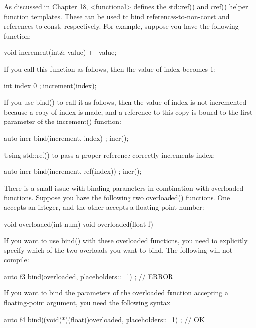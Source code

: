 As discussed in Chapter 18, <functional> defines the std::ref() and cref() helper function templates. These can be used to bind references-to-non-const and references-to-const, respectively. For example, suppose you have the following function:

\begin{cpp}
void increment(int& value) { ++value; }
\end{cpp}

If you call this function as follows, then the value of index becomes 1:

\begin{cpp}
int index { 0 };
increment(index);
\end{cpp}

If you use bind() to call it as follows, then the value of index is not incremented because a copy of index is made, and a reference to this copy is bound to the first parameter of the increment() function:

\begin{cpp}
auto incr { bind(increment, index) };
incr();
\end{cpp}

Using std::ref() to pass a proper reference correctly increments index:

\begin{cpp}
auto incr { bind(increment, ref(index)) };
incr();
\end{cpp}

There is a small issue with binding parameters in combination with overloaded functions. Suppose you have the following two overloaded() functions. One accepts an integer, and the other accepts a floating-point number:

\begin{cpp}
void overloaded(int num) {}
void overloaded(float f) {}
\end{cpp}

If you want to use bind() with these overloaded functions, you need to explicitly specify which of the two overloads you want to bind. The following will not compile:

\begin{cpp}
auto f3 { bind(overloaded, placeholders::_1) }; // ERROR
\end{cpp}

If you want to bind the parameters of the overloaded function accepting a floating-point argument, you need the following syntax:

\begin{cpp}
auto f4 { bind((void(*)(float))overloaded, placeholders::_1) }; // OK
\end{cpp}


